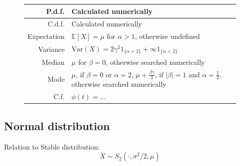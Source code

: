 \documentclass[a4paper,11pt]{article}
\theoremstyle{plain}
\theoremstyle{definition}
\newcommand{\ME}{\mathbb{E}}
\newcommand{\Var}{\mathrm{Var}}
\begin{document}
\begin{figure}[!htb]
\begin{minipage}{0.4\textwidth}
\begin{tabular}{| r | l |}
			\hline
			P.d.f. & Calculated numerically \\
			\hline
			C.d.f. & Calculated numerically \\
			\hline
			Expectation & \pbox{\linewidth}{$\ME[X] = \mu$ for $\alpha > 1$,\\ otherwise undefined} \\
			\hline
			Variance & $\Var(X) = 2 \gamma^2 1_{\{ \alpha = 2 \} } + \infty 1_{ \{ \alpha < 2 \} }  $ \\
			\hline
			Median & \pbox{\linewidth}{$\mu$ for $\beta = 0$,\\ otherwise searched numerically} \\
			\hline
			Mode & \pbox{\linewidth}{$\mu$, if $\beta = 0$ or $\alpha = 2$, \\  $\mu + \frac{\beta \gamma}{3}$, if $|\beta| = 1$ and $\alpha = \frac{1}{2}$, \\ otherwise searched numerically} \\
			\hline
			C.f. & $\phi(t) = ...$ \\
			\hline
		\end{tabular}
	    \end{minipage}
	\end{figure}
	
	\subsection{Normal distribution}
	Relation to Stable distribution:
	\[X \sim S_{2}(\cdot, \sigma^2/2, \mu) \]
	
\end{document}
